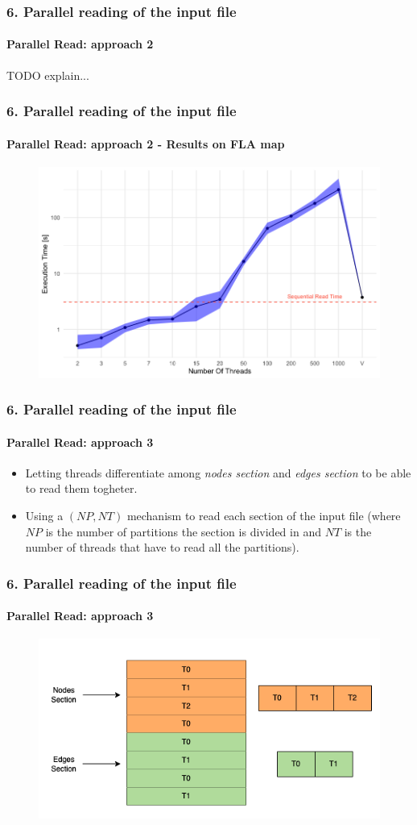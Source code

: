 \documentclass[12pt]{beamer}
\begin{document}
	\begin{frame}
		\frametitle{6. Parallel reading of the input file}
		\framesubtitle{Parallel Read: approach 2}
		TODO explain...
	\end{frame}
	\begin{frame}
		\frametitle{6. Parallel reading of the input file}
		\framesubtitle{Parallel Read: approach 2 - Results on FLA map}
		\begin{figure}[ht!]
			\centering
			\includegraphics[width=1\linewidth]{par_read_2_time.png}
			\label{parread2time}
		  \end{figure}
	\end{frame}
	\begin{frame}
		\frametitle{6. Parallel reading of the input file}
		\framesubtitle{Parallel Read: approach 3}
		\begin{itemize}
			\item Letting threads differentiate among \textit{nodes section} and 
				  \textit{edges section} to be able to read them togheter.
			\item Using a $(NP, NT)$ mechanism to read each section of the input file (where
				  $NP$ is the number of partitions the section is divided in and $NT$ is the number
				  of threads that have to read all the partitions).
		\end{itemize}
	\end{frame}
	\begin{frame}
		\frametitle{6. Parallel reading of the input file}
		\framesubtitle{Parallel Read: approach 3}
		\begin{figure}[ht!]
			\centering
			\includegraphics[width=0.75\linewidth]{par_read_3.png}
			\label{parread3}
		  \end{figure}
	\end{frame}
\end{document}
